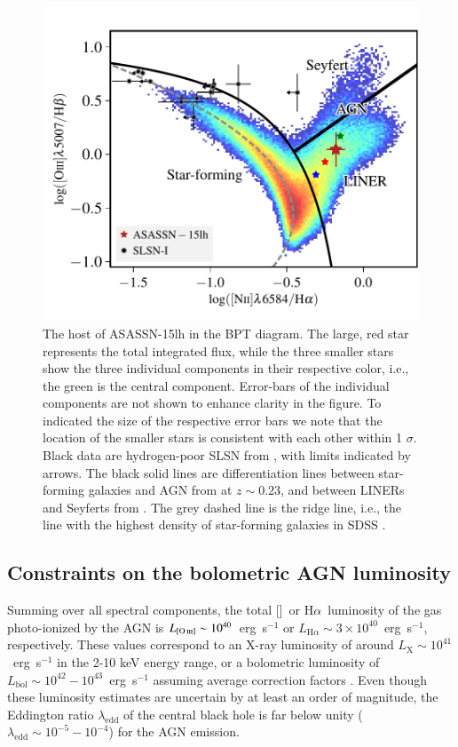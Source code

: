 \documentclass[traditabstract]{aa}
\newcommand{\ha}{H$\alpha$}
\newcommand{\oiii}{[\ion{O}{iii}]}
\begin{document}
\begin{figure}
  \includegraphics[width=0.999\linewidth]{fig/BPT.pdf}
\caption{The host of ASASSN-15lh in the BPT diagram. The large, red star represents the total integrated flux, while the three smaller stars show the three individual components in their respective color, i.e., the green is the central component. Error-bars of the individual components are not shown to enhance clarity in the figure. To indicated the size of the respective error bars we note that the location of the smaller stars is consistent with each other within 1 $\sigma$. Black data are hydrogen-poor SLSN from \citet{2015MNRAS.449..917L}, with limits indicated by arrows. The black solid lines are differentiation lines between star-forming galaxies and AGN from \citet{2013ApJ...774L..10K} at $z\sim0.23$, and between LINERs and Seyferts from \citet{2010MNRAS.403.1036C}. The grey dashed line is the ridge line, i.e., the line with the highest density of star-forming galaxies in SDSS \citep{2008MNRAS.385..769B}.}
\label{fig:BPT}
\end{figure}

\subsection{Constraints on the bolometric AGN luminosity}

Summing over all spectral components, the total \oiii~or \ha~luminosity of the gas photo-ionized by the AGN is $L_{\oiii}\sim10^{40}$~erg~s$^{-1}$ or $L_{\mathrm{H}\alpha} \sim 3 \times 10^{40}$~erg~s$^{-1}$, respectively. These values correspond to an X-ray luminosity of around $L_{\mathrm{X}}\sim10^{41}$~erg~s$^{-1}$ in the 2-10 keV energy range, or a bolometric luminosity of $L_{\mathrm{bol}}\sim10^{42} - 10^{43} $~erg~s$^{-1}$ assuming average correction factors \citep{2008ARA&A..46..475H, 2009A&A...504...73L, 2012MNRAS.425..623L}. Even though these luminosity estimates are uncertain by at least an order of magnitude, the Eddington ratio $\lambda_{\mathrm{edd}}$ of the central black hole is far below unity ($\lambda_{\mathrm{edd}}\sim10^{-5}-10^{-4}$) for the AGN emission.
\end{document}
